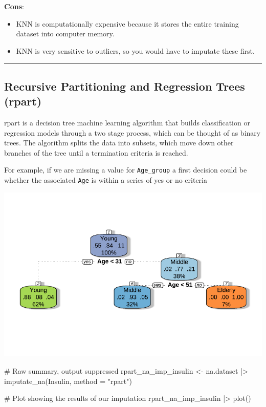 \documentclass[
  letterpaper,
  DIV=11,
  numbers=noendperiod]{scrreprt}
\newenvironment{Shaded}{\begin{snugshade}}{\end{snugshade}}
\newcommand{\AttributeTok}[1]{\textcolor[rgb]{0.40,0.45,0.13}{#1}}
\newcommand{\CommentTok}[1]{\textcolor[rgb]{0.37,0.37,0.37}{#1}}
\newcommand{\FunctionTok}[1]{\textcolor[rgb]{0.28,0.35,0.67}{#1}}
\newcommand{\NormalTok}[1]{\textcolor[rgb]{0.00,0.23,0.31}{#1}}
\newcommand{\OtherTok}[1]{\textcolor[rgb]{0.00,0.23,0.31}{#1}}
\newcommand{\SpecialCharTok}[1]{\textcolor[rgb]{0.37,0.37,0.37}{#1}}
\newcommand{\StringTok}[1]{\textcolor[rgb]{0.13,0.47,0.30}{#1}}
\begin{document}
\textbf{Cons}:

\begin{itemize}
\item
  KNN is computationally expensive because it stores the entire training
  dataset into computer memory.
\item
  KNN is very sensitive to outliers, so you would have to imputate these
  first.
\end{itemize}

\begin{center}\rule{0.5\linewidth}{0.5pt}\end{center}

\hypertarget{recursive-partitioning-and-regression-trees-rpart}{%
\subsection{Recursive Partitioning and Regression Trees
(rpart)}\label{recursive-partitioning-and-regression-trees-rpart}}

rpart is a decision tree machine learning algorithm that builds
classification or regression models through a two stage process, which
can be thought of as binary trees. The algorithm splits the data into
subsets, which move down other branches of the tree until a termination
criteria is reached.

For example, if we are missing a value for \texttt{Age\_group} a first
decision could be whether the associated \texttt{Age} is within a series
of yes or no criteria

\includegraphics{./ImputatingLikeDataScientist_files/figure-pdf/unnamed-chunk-21-1.pdf}

\begin{Shaded}
\begin{Highlighting}[]
\CommentTok{\# Raw summary, output suppressed}
\NormalTok{rpart\_na\_imp\_insulin }\OtherTok{\textless{}{-}}\NormalTok{ na.dataset }\SpecialCharTok{|\textgreater{}}
  \FunctionTok{imputate\_na}\NormalTok{(Insulin, }\AttributeTok{method =} \StringTok{"rpart"}\NormalTok{)}

\CommentTok{\# Plot showing the results of our imputation}
\NormalTok{rpart\_na\_imp\_insulin }\SpecialCharTok{|\textgreater{}}
  \FunctionTok{plot}\NormalTok{()}
\end{Highlighting}
\end{Shaded}
\end{document}
